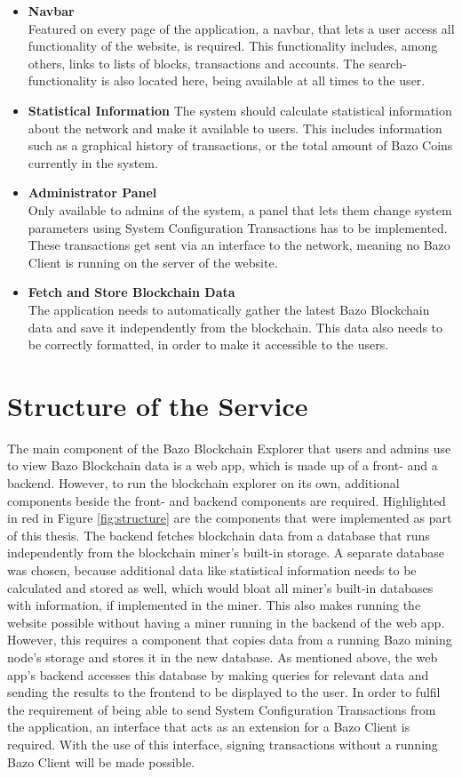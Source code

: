 \begin{itemize}
\item \textbf{Navbar}\\
Featured on every page of the application, a navbar, that lets a user access all functionality of the website, is required. This functionality includes, among others, links to lists of blocks, transactions and accounts. The search-functionality is also located here, being available at all times to the user.
\item \textbf{Statistical Information}
The system should calculate statistical information about the network and make it available to users. This includes information such as a graphical history of transactions, or the total amount of Bazo Coins currently in the system.
\item \textbf{Administrator Panel}\\
Only available to admins of the system, a panel that lets them change system parameters using System Configuration Transactions has to be implemented. These transactions get sent via an interface \cite{marc} to the network, meaning no Bazo Client is running on the server of the website.
\item \textbf{Fetch and Store Blockchain Data}\\
The application needs to automatically gather the latest Bazo Blockchain data and save it independently from the blockchain. This data also needs to be correctly formatted, in order to make it accessible to the users. 
\end{itemize}

\section{Structure of the Service} \label{structure}
The main component of the Bazo Blockchain Explorer that users and admins use to view Bazo Blockchain data is a web app, which is made up of a front- and a backend. However, to run the blockchain explorer on its own, additional components beside the front- and backend components are required. Highlighted in red in Figure \ref{fig:structure} are the components that were implemented as part of this thesis. The backend fetches blockchain data from a database that runs independently from the blockchain miner's built-in storage. A separate database was chosen, because additional data like statistical information needs to be calculated and stored as well, which would bloat all miner's built-in databases with information, if implemented in the miner. This also makes running the website possible without having a miner running in the backend of the web app. However, this requires a component that copies data from a running Bazo mining node's storage and stores it in the new database. As mentioned above, the web app's backend accesses this database by making queries for relevant data and sending the results to the frontend to be displayed to the user. In order to fulfil the requirement of being able to send System Configuration Transactions from the application, an interface that acts as an extension for a Bazo Client is required. With the use of this interface, signing transactions without a running Bazo Client will be made possible.

